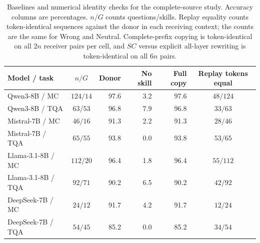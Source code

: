 \begin{table}[t]
\centering
\caption{Baselines and numerical identity checks for the complete-source
study. Accuracy columns are percentages. $n/G$ counts questions/skills.
Replay equality counts token-identical sequences against the donor in
each receiving context; the counts are the same for Wrong and Neutral.
Complete-prefix copying is token-identical on all $2n$ receiver pairs
per cell, and $SC$ versus explicit all-layer rewriting is token-identical
on all $6n$ pairs.}
\label{tab:state-baselines}
\normalfont\rmfamily\fontsize{9}{11}\selectfont
\renewcommand{\arraystretch}{1.18}
\setlength{\tabcolsep}{2.5pt}
\setlength{\heavyrulewidth}{0.7pt}
\setlength{\lightrulewidth}{0.3pt}
\setlength{\aboverulesep}{2pt}
\setlength{\belowrulesep}{2.5pt}
\begin{tabularx}{\textwidth}{@{}Xcrrrc@{}}
\toprule
\rowcolor[HTML]{E4F4FA}
Model / task & $n/G$ & Donor & No skill & Full copy & Replay tokens equal \\
\midrule
Qwen3-8B / MC & $124/14$ & 97.6 & 3.2 & 97.6 & $48/124$ \\
Qwen3-8B / TQA & $63/53$ & 96.8 & 7.9 & 96.8 & $33/63$ \\
Mistral-7B / MC & $46/16$ & 91.3 & 2.2 & 91.3 & $28/46$ \\
Mistral-7B / TQA & $65/55$ & 93.8 & 0.0 & 93.8 & $53/65$ \\
Llama-3.1-8B / MC & $112/20$ & 96.4 & 1.8 & 96.4 & $55/112$ \\
Llama-3.1-8B / TQA & $92/71$ & 90.2 & 6.5 & 90.2 & $42/92$ \\
DeepSeek-7B / MC & $24/12$ & 91.7 & 4.2 & 91.7 & $12/24$ \\
DeepSeek-7B / TQA & $54/45$ & 85.2 & 0.0 & 85.2 & $34/54$ \\
\bottomrule
\end{tabularx}
\end{table}

